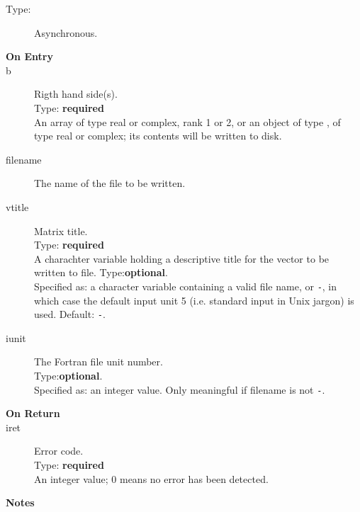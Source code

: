 \begin{description}
\item[Type:] Asynchronous.
\item[\bf  On Entry ]
\item[b] Rigth hand side(s).\\
Type: {\bf required} \\
An  array of type real or complex, rank 1 or 2, or an
object of type \vdata, of type real or complex; its contents will be
written to disk.\\
\item[filename] The name of the file to be written.\\
\item[vtitle] Matrix title.\\
Type: {\bf required} \\
A charachter variable holding a descriptive title for the vector to be
 written to file.
Type:{\bf optional}.\\
Specified as: a character variable containing a valid file name, or
\verb|-|, in which case the default input unit  5 (i.e. standard input
in Unix jargon) is used. Default: \verb|-|. 
\item[iunit] The Fortran file unit number.\\
Type:{\bf optional}.\\
Specified as: an integer value. Only meaningful if filename is not \verb|-|.
\end{description}

\begin{description}
\item[\bf On Return]
\item[iret] Error code.\\
Type: {\bf required} \\
An integer value; 0 means no error has been detected. 
\end{description}

{\par\noindent\large\bfseries Notes}

